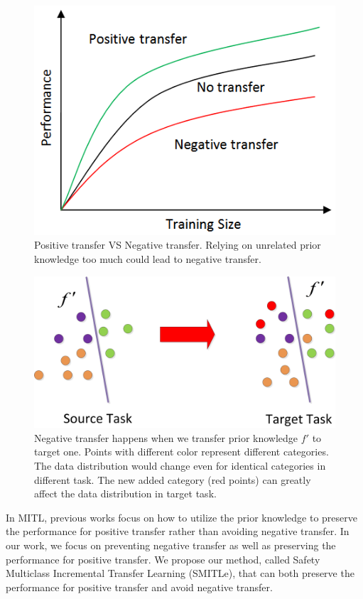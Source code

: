 \begin{figure}
\centering
\includegraphics[scale=.5]{fig/negative.png}
\caption{Positive transfer VS Negative transfer. Relying on unrelated prior knowledge too much could lead to negative transfer.}\label{fig:neg}
\end{figure}
\begin{figure}
\centering
\includegraphics[scale=.4]{fig/domain.jpg}
\caption{Negative transfer happens when we transfer prior knowledge $f'$ to target one. Points with different color represent different categories. The data distribution would change even for identical categories in different task. The new added category (red points) can greatly affect the data distribution in target task. }\label{fig:distribution}
\end{figure}
In MITL, previous works focus on how to utilize the prior knowledge to preserve the performance for positive transfer rather than avoiding negative transfer. In our work, we focus on preventing negative transfer as well as preserving the performance for positive transfer. We propose our method, called Safety Multiclass Incremental Transfer Learning (SMITLe), that can both preserve the performance for positive transfer and avoid negative transfer. 
